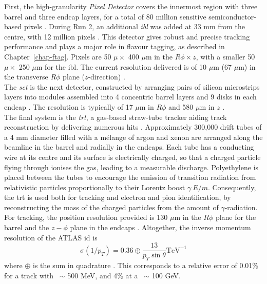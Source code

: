 First, the high-granularity \textit{Pixel Detector} covers the innermost region with three barrel and three endcap layers, for a total of 80 million sensitive semiconductor-based pixels \cite{CERN-LHCC-97-016, Potamianos:2015lar}. During Run 2, an additional \textit{\gls{ibl}} was added at 33 mm from the centre, with 12 million pixels \cite{Capeans:1291633}. This detector gives robust and precise tracking performance and plays a major role in flavour tagging, as described in Chapter~\ref{chap-ftag}. Pixels are 50 $\mu \times$ 400 $\mu$m in the $R\phi \times z$, with a smaller 50 $\mu \times$ 250 $\mu$m for the \gls{ibl}. The current resolution delivered is of 10 $\mu$m (67 $\mu$m) in the transverse $R\phi$ plane ($z$-direction) \cite{Pernegger_2015, ATL-INDET-PUB-2016-001}. \\

The \textit{\gls{sct}} is the next detector, constructed by arranging pairs of silicon microstrips layers into modules assembled into 4 concentric barrel layers and 9 disks in each endcap \cite{AHMAD200798, CERN-LHCC-2017-005}. The resolution is typically of 17 $\mu$m in $R\phi$ and 580 $\mu$m in $z$ \cite{ATLASSCT}. \\

The final system is the \textit{\gls{trt}}, a gas-based straw-tube tracker aiding track reconstruction by delivering numerous hits \cite{TheATLASTRTcollaboration_2008}. Approximately 300,000 drift tubes of a 4 mm diameter filled with a mélange of argon and xenon are arranged along the beamline in the barrel and radially in the endcaps. Each tube has a conducting wire at its centre and its surface is electrically charged, so that a charged particle flying through ionises the gas, leading to a measurable discharge. Polyethylene is placed between the tubes to encourage the emission of transition radiation from relativistic particles proportionally to their Lorentz boost $\gamma ~ E / m$. Consequently, the \gls{trt} is used both for tracking and electron and pion identification, by reconstructing the mass of the charged particles from the amount of $\gamma$-radiation. For tracking, the position resolution provided is 130 $\mu$m in the $R\phi$ plane for the barrel and the $z-\phi$ plane in the endcaps \cite{Vogel:1537991}. Altogether, the inverse momentum resolution of the ATLAS \gls{id} is
\begin{equation}
  \sigma(1 / p_T) = 0.36 \oplus \frac{13}{p_T \sin\theta} \text{TeV}^{-1}
\end{equation}
where $\oplus$ is the sum in quadrature \cite{TheATLASCollaboration_2008}. This corresponds to a relative error of 0.01\% for a track with \pt\ $\sim$ 500 MeV, and 4\% at a \pt\ $\sim$ 100 GeV.

